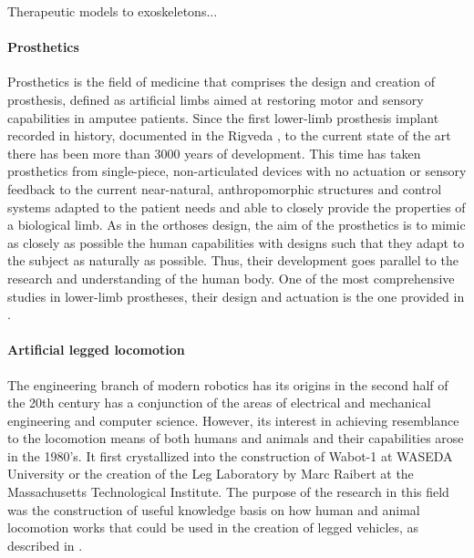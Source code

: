 Therapeutic models to exoskeletons... 

\paragraph{Prosthetics} %
\label{par:prosthetics}
Prosthetics is the field of medicine that comprises the design and creation of prosthesis, defined as artificial limbs aimed at restoring motor and sensory capabilities in amputee patients.
Since the first lower-limb prosthesis implant recorded in history, documented in the Rigveda \cite{prosthetics_history}, to the current state of the art there has been more than 3000 years of development.
This time has taken prosthetics from single-piece, non-articulated devices with no actuation or sensory feedback to the current near-natural, anthropomorphic structures and control systems adapted to the patient needs and able to closely provide the properties of a biological limb.
As in the orthoses design, the aim of the prosthetics is to mimic as closely as possible the human capabilities with designs such that they adapt to the subject as naturally as possible.
Thus, their development goes parallel to the research and understanding of the human body.
One of the most comprehensive studies in lower-limb prostheses, their design and actuation is the one provided in \cite{grimmer}.


\paragraph{Artificial legged locomotion} %
\label{par:humanoid_robots}  
The engineering branch of modern robotics has its origins in the second half of the 20th century has a conjunction of the areas of electrical and mechanical engineering and computer science.
However, its interest in achieving resemblance to the locomotion means of both humans and animals  and their capabilities arose in the 1980's.
It first crystallized into the construction of Wabot-1 at WASEDA University or the creation of the Leg Laboratory by Marc Raibert at the Massachusetts Technological Institute.
The purpose of the research in this field was the construction of useful knowledge basis on how human and animal locomotion works that could be used in the creation of legged vehicles, as described in \cite{mit_leg_lab1}.

